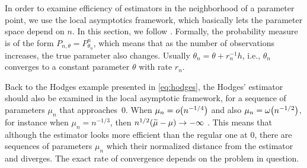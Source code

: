 \documentclass[ejs, twoside]{imsart}
\theoremstyle{plain}
\theoremstyle{remark}
\newcommand{\iid}{i.i.d.}
\newcommand{\asymleq}[1]{o\left( #1 \right)}
\newcommand{\asymgtr}[1]{\omega\left( #1 \right)}
\numberwithin{equation}{section}
\numberwithin{table}{section}
\numberwithin{figure}{section}
\let\originalleft\left
\let\originalright\right
\renewcommand{\left}{\mathopen{}\mathclose\bgroup\originalleft}
\renewcommand{\right}{\aftergroup\egroup\originalright}
\begin{document}
\label{sec:la-localparam}

In order to examine efficiency of estimators in the neighborhood of a parameter point, we use the local asymptotics framework, which basically lets the parameter space depend on $n$. In this section, we follow \citet[Chapters 7, 9, and 15]{van_der_vaart_asymptotic_1998}. Formally, the probability measure is of the form \(P_{n,\theta} = P_{\theta_n}^n\), which means that as the number of observations increases, the true parameter also changes. Usually \(\theta_n = \theta + r_n^{-1}h\), i.e., \(\theta_n\) converges to a constant parameter \(\theta\) with rate \(r_n\).




Back to the Hodges example presented in \eqref{eq:hodges}, the Hodges' estimator should also be examined in the local asymptotic framework, for a sequence of parameters \(\mu_n\) that approaches~\(0\). When \(\mu_n = \asymleq{n^{-1/4}}\) and also \(\mu_n = \asymgtr{n^{-1/2}}\), for instance when \(\mu_n = n^{-1/3}\), then \(n^{1/2}\left(\widetilde{\mu} - \mu \right) \to -\infty \) \citep[Example~8.1]{van_der_vaart_asymptotic_1998}. This means that although the estimator looks more efficient than the regular one at \(0\), there are sequences of parameters \(\mu_n\) which their normalized distance from the estimator and diverges. The exact rate of convergence depends on the problem in question.

\end{document}
